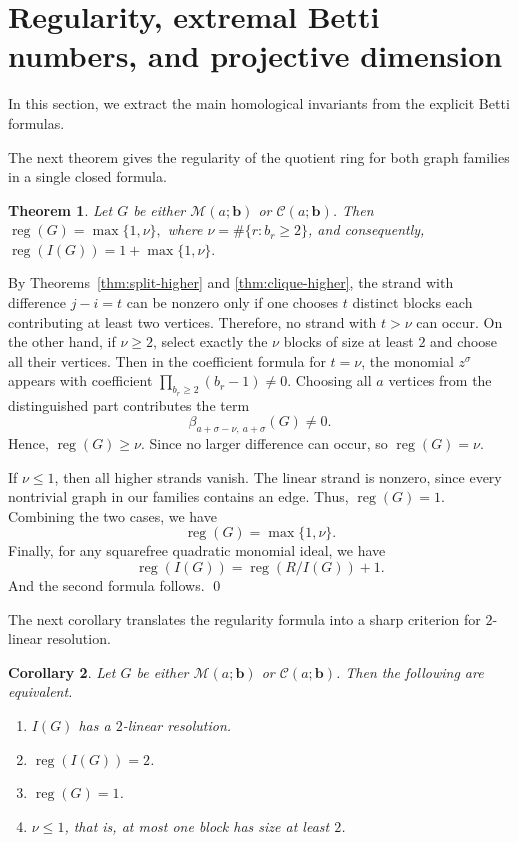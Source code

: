 \documentclass[12pt]{article}
\renewenvironment{proof}{{\bf \noindent Proof.}}{\qed}
\newtheorem{theorem}{Theorem}[section]
\newtheorem{corollary}[theorem]{Corollary}
\theoremstyle{definition}
\theoremstyle{remark}
\DeclareMathOperator{\reg}{reg}
\newcommand{\MM}{\mathcal{M}}
\newcommand{\CC}{\mathcal{C}}
\newcommand{\bk}[1]{\mathbf{#1}}
\begin{document}
	\section{Regularity, extremal Betti numbers, and projective dimension}\label{sec:invariants}
	
	In this section, we extract the main homological invariants from the explicit Betti formulas.
	
	 \medskip The next theorem gives the regularity of the quotient ring for both graph families in a single closed formula.
	
	\begin{theorem}\label{thm:regularity}
		Let $G$ be either $\MM(a;\bk{b})$ or $\CC(a;\bk{b})$. Then
		$ \reg(G)=\max\{1,\nu\}, $
		where $\nu=\#\{r:b_r\geq 2\}$, and consequently, 		$ \reg(I(G))=1+\max\{1,\nu\}. $
	\end{theorem}
	
	\begin{proof}
		By Theorems~\ref{thm:split-higher} and \ref{thm:clique-higher}, the strand with difference $j-i=t$ can be nonzero only if one chooses $t$ distinct blocks each contributing at least two vertices. Therefore, no strand with $t>\nu$ can occur. On the other hand, if $\nu\geq 2$, select exactly the $\nu$ blocks of size at least $2$ and choose all their vertices. Then in the coefficient formula for $t=\nu$, the monomial $z^\sigma$ appears with coefficient 	$ \prod_{b_r\geq 2}(b_r-1)\neq 0. $
		Choosing all $a$ vertices from the distinguished part contributes the term
		$$
		\beta_{a+\sigma-\nu,\ a+\sigma}(G)\neq 0.
		$$
		Hence, $\reg(G)\geq \nu$. Since no larger difference can occur, so $\reg(G)=\nu$.
		
		If $\nu\leq 1$, then all higher strands vanish. The linear strand is nonzero,  since every nontrivial graph in our families contains an edge. Thus, $\reg(G)=1$. Combining the two cases, we have
		$$
		\reg(G)=\max\{1,\nu\}.
		$$
		Finally, for any squarefree quadratic monomial ideal, we have
		$$
		\reg(I(G))=\reg(R/I(G))+1.
		$$
		And the second formula follows.
	\end{proof}
	
	 \medskip The next corollary translates the regularity formula into a sharp criterion for $2$-linear resolution.
	
	\begin{corollary}\label{cor:2linear}
		Let $G$ be either $\MM(a;\bk{b})$ or $\CC(a;\bk{b})$. Then the following are equivalent.
		
		\begin{enumerate}[label=\textup{(\roman*)},noitemsep]
			\item $I(G)$ has a $2$-linear resolution.
			\item $\reg(I(G))=2$.
			\item $\reg(G)=1$.
			\item $\nu\leq 1$, that is, at most one block has size at least $2$.
		\end{enumerate}
	\end{corollary}
	
\end{document}
